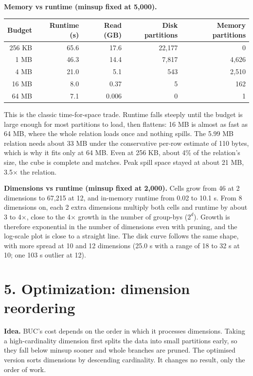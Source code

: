 \documentclass[10pt]{article}
\begin{document}
\textbf{Memory vs runtime (minsup fixed at 5,000).}
\begin{center}\small
\begin{tabular}{rrrrr}
\toprule
Budget & Runtime (s) & Read (GB) & Disk partitions & Memory partitions \\
\midrule
256 KB & 65.6 & 17.6 & 22,177 & 0 \\
1 MB & 46.3 & 14.4 & 7,817 & 4,626 \\
4 MB & 21.0 & 5.1 & 543 & 2,510 \\
16 MB & 8.0 & 0.37 & 5 & 162 \\
64 MB & 7.1 & 0.006 & 0 & 1 \\
\bottomrule
\end{tabular}
\end{center}
This is the classic time-for-space trade. Runtime falls steeply until the budget is large enough for most partitions to load, then flattens: 16 MB is almost as fast as 64 MB, where the whole relation loads once and nothing spills. The 5.99 MB relation needs about 33 MB under the conservative per-row estimate of 110 bytes, which is why it fits only at 64 MB. Even at 256 KB, about 4\% of the relation's size, the cube is complete and matches. Peak spill space stayed at about 21 MB, 3.5$\times$ the relation.

\textbf{Dimensions vs runtime (minsup fixed at 2,000).} Cells grow from 46 at 2 dimensions to 67,215 at 12, and in-memory runtime from 0.02 to 10.1 s. From 8 dimensions on, each 2 extra dimensions multiply both cells and runtime by about 3 to 4$\times$, close to the 4$\times$ growth in the number of group-bys ($2^d$). Growth is therefore exponential in the number of dimensions even with pruning, and the log-scale plot is close to a straight line. The disk curve follows the same shape, with more spread at 10 and 12 dimensions (25.0 s with a range of 18 to 32 s at 10; one 103 s outlier at 12).

\section*{5. Optimization: dimension reordering}
\textbf{Idea.} BUC's cost depends on the order in which it processes dimensions. Taking a high-cardinality dimension first splits the data into small partitions early, so they fall below minsup sooner and whole branches are pruned. The optimised version sorts dimensions by descending cardinality. It changes no result, only the order of work.
\end{document}
